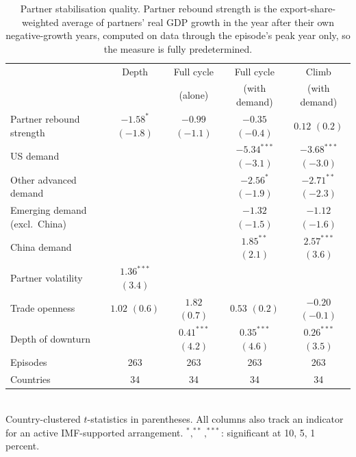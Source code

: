\begin{table}[H]
\centering
\footnotesize
\setlength{\tabcolsep}{4pt}
\caption{Partner stabilisation quality. Partner rebound strength is the export-share-weighted average of partners' real GDP growth in the year after their own negative-growth years, computed on data through the episode's peak year only, so the measure is fully predetermined.}
\label{tab:stabilization}
\begin{tabular}{lcccc}
\toprule
 & Depth & Full cycle & Full cycle & Climb \\
 &  & (alone) & (with demand) & (with demand) \\
\midrule
Partner rebound strength & $-1.58^{*}$ {\scriptsize$(-1.8)$} & $-0.99$ {\scriptsize$(-1.1)$} & $-0.35$ {\scriptsize$(-0.4)$} & $0.12$ {\scriptsize$(0.2)$} \\
US demand &  &  & $-5.34^{***}$ {\scriptsize$(-3.1)$} & $-3.68^{***}$ {\scriptsize$(-3.0)$} \\
Other advanced demand &  &  & $-2.56^{*}$ {\scriptsize$(-1.9)$} & $-2.71^{**}$ {\scriptsize$(-2.3)$} \\
Emerging demand (excl.\ China) &  &  & $-1.32$ {\scriptsize$(-1.5)$} & $-1.12$ {\scriptsize$(-1.6)$} \\
China demand &  &  & $1.85^{**}$ {\scriptsize$(2.1)$} & $2.57^{***}$ {\scriptsize$(3.6)$} \\
Partner volatility & $1.36^{***}$ {\scriptsize$(3.4)$} &  &  &  \\
Trade openness & $1.02$ {\scriptsize$(0.6)$} & $1.82$ {\scriptsize$(0.7)$} & $0.53$ {\scriptsize$(0.2)$} & $-0.20$ {\scriptsize$(-0.1)$} \\
Depth of downturn &  & $0.41^{***}$ {\scriptsize$(4.2)$} & $0.35^{***}$ {\scriptsize$(4.6)$} & $0.26^{***}$ {\scriptsize$(3.5)$} \\
\midrule
Episodes & 263 & 263 & 263 & 263 \\
Countries & 34 & 34 & 34 & 34 \\
\bottomrule\end{tabular}
\\[2pt]\footnotesize{Country-clustered $t$-statistics in parentheses. All columns also track an indicator for an active IMF-supported arrangement. $^{*},^{**},^{***}$: significant at 10, 5, 1 percent.}
\end{table}
